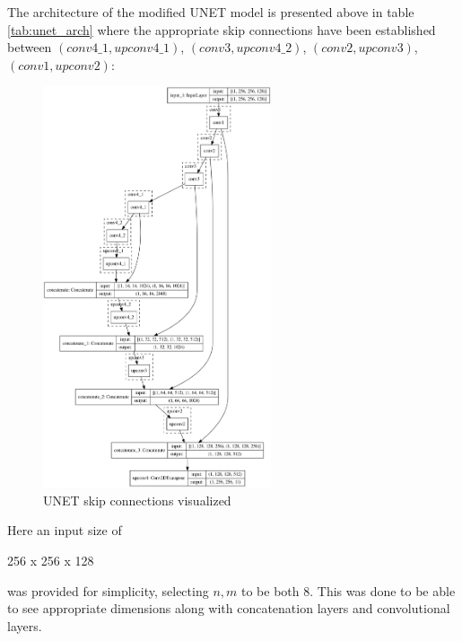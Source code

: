 \documentclass[a4paper,12pt]{article}
\begin{document}
\vspace{4mm}

\par The architecture of the modified UNET model is presented above in table \ref{tab:unet_arch} where the appropriate skip connections have been established between $(conv4\_1, upconv4\_1)$, $(conv3, upconv4\_2)$, $(conv2, upconv3)$, $(conv1, upconv2)$:

\vspace{4mm}

\begin{figure}[H]
    \centering
    \includegraphics[width=0.6\textwidth]{model.png}
    \caption{UNET skip connections visualized}
    \label{fig:unet_skip_vis}
\end{figure}

\vspace{4mm}

\par Here an input size of  \begin{markdown}
256 x 256 x 128
\end{markdown}
was provided for simplicity, selecting $n, m$ to be both $8$. This was done to be able to see appropriate dimensions along with concatenation layers and convolutional layers. 
\end{document}
